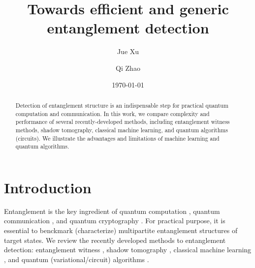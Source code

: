 \documentclass[
10pt,
aps,
pra,
linenumbers,
floatfix,
]{revtex4-2}
\theoremstyle{plain}
\theoremstyle{definition}
\begin{document}
\title{Towards efficient and generic entanglement detection}
\author{Jue Xu}
\author{Qi Zhao}
\date{\today}
\begin{abstract}
	Detection of entanglement structure is an indispensable step for practical quantum computation and communication.
	In this work, we compare complexity and performance of several recently-developed methods, including entanglement witness methods, shadow tomography, classical machine learning, and quantum algorithms (circuits).
	We illustrate the advantages and limitations of machine learning and quantum algorithms.
\end{abstract}

\maketitle
 \tableofcontents

\section{Introduction}
Entanglement \cite{horodeckiQuantumEntanglement2009} is the key ingredient of quantum computation \cite{}, quantum communication \cite{}, and quantum cryptography \cite{}.
For practical purpose, it is essential to benckmark (characterize) multipartite entanglement structures of target states.
We review the recently developed methods to entanglement detection: entanglement witness \cite{zhouDetectingMultipartiteEntanglement2019}, shadow tomography \cite{huangPredictingManyProperties2020}, classical machine learning \cite{huangPowerDataQuantum2021}, and quantum (variational/circuit) algorithms \cite{quekMultivariateTraceEstimation2022}.
\end{document}
